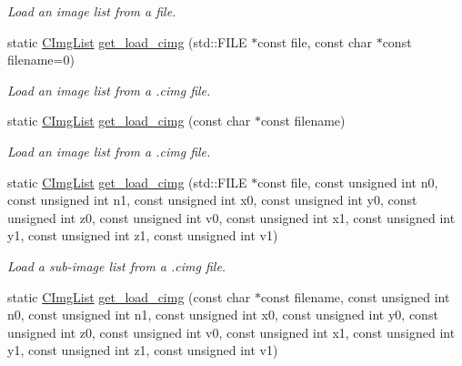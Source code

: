 \begin{DoxyCompactItemize}
\begin{DoxyCompactList}\small\item\em Load an image list from a file. \end{DoxyCompactList}\item 
\hypertarget{structcimg__library_1_1_c_img_list_a1dc19bf70de1c3e2144d88a51aa135cf}{static \hyperlink{structcimg__library_1_1_c_img_list}{C\-Img\-List} \hyperlink{structcimg__library_1_1_c_img_list_a1dc19bf70de1c3e2144d88a51aa135cf}{get\-\_\-load\-\_\-cimg} (std\-::\-F\-I\-L\-E $\ast$const file, const char $\ast$const filename=0)}\label{structcimg__library_1_1_c_img_list_a1dc19bf70de1c3e2144d88a51aa135cf}

\begin{DoxyCompactList}\small\item\em Load an image list from a .cimg file. \end{DoxyCompactList}\item 
\hypertarget{structcimg__library_1_1_c_img_list_ae46658b616de758970da7ed386823fc2}{static \hyperlink{structcimg__library_1_1_c_img_list}{C\-Img\-List} \hyperlink{structcimg__library_1_1_c_img_list_ae46658b616de758970da7ed386823fc2}{get\-\_\-load\-\_\-cimg} (const char $\ast$const filename)}\label{structcimg__library_1_1_c_img_list_ae46658b616de758970da7ed386823fc2}

\begin{DoxyCompactList}\small\item\em Load an image list from a .cimg file. \end{DoxyCompactList}\item 
\hypertarget{structcimg__library_1_1_c_img_list_ab589740d5689055ad3c94dbd51e38762}{static \hyperlink{structcimg__library_1_1_c_img_list}{C\-Img\-List} \hyperlink{structcimg__library_1_1_c_img_list_ab589740d5689055ad3c94dbd51e38762}{get\-\_\-load\-\_\-cimg} (std\-::\-F\-I\-L\-E $\ast$const file, const unsigned int n0, const unsigned int n1, const unsigned int x0, const unsigned int y0, const unsigned int z0, const unsigned int v0, const unsigned int x1, const unsigned int y1, const unsigned int z1, const unsigned int v1)}\label{structcimg__library_1_1_c_img_list_ab589740d5689055ad3c94dbd51e38762}

\begin{DoxyCompactList}\small\item\em Load a sub-\/image list from a .cimg file. \end{DoxyCompactList}\item 
\hypertarget{structcimg__library_1_1_c_img_list_a9499eeafc3e2651e33fb062a5f4ab71f}{static \hyperlink{structcimg__library_1_1_c_img_list}{C\-Img\-List} \hyperlink{structcimg__library_1_1_c_img_list_a9499eeafc3e2651e33fb062a5f4ab71f}{get\-\_\-load\-\_\-cimg} (const char $\ast$const filename, const unsigned int n0, const unsigned int n1, const unsigned int x0, const unsigned int y0, const unsigned int z0, const unsigned int v0, const unsigned int x1, const unsigned int y1, const unsigned int z1, const unsigned int v1)}\label{structcimg__library_1_1_c_img_list_a9499eeafc3e2651e33fb062a5f4ab71f}


\end{DoxyCompactItemize}
